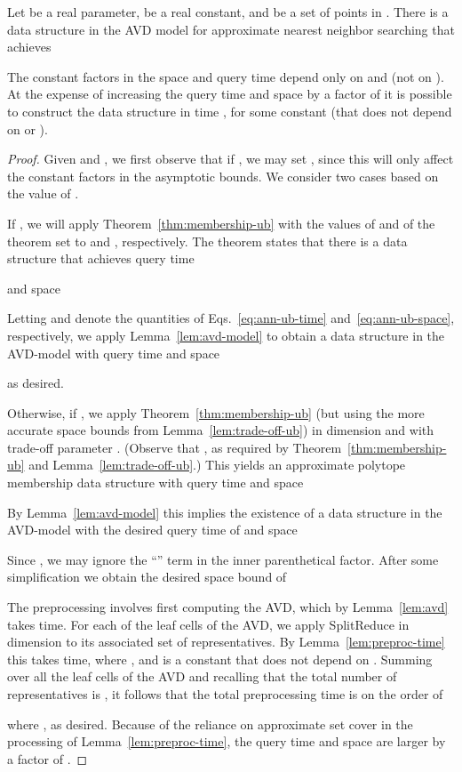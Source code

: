 \documentclass[11pt]{article}   \usepackage[letterpaper,hmargin=2.1cm,vmargin=3cm]{geometry}
\newcommand{\alg}{\textrm{SplitReduce}}
\begin{document}
\begin{lemma} \label{lem:ann-ub}
Let  be a real parameter,  be a real constant, and  be a set of  points in . There is a data structure in the AVD model for approximate nearest neighbor searching that achieves

The constant factors in the space and query time depend only on  and  (not on ). At the expense of increasing the query time and space by a factor of  it is possible to construct the data structure in time , for some constant  (that does not depend on  or ).
\end{lemma}


\begin{proof}
Given  and , we first observe that if , we may set , since this will only affect the constant factors in the asymptotic bounds. We consider two cases based on the value of . 

If , we will apply Theorem~\ref{thm:membership-ub} with the values of  and  of the theorem set to  and , respectively. The theorem states that there is a data structure that achieves query time 

and space

Letting  and  denote the quantities of Eqs.~\eqref{eq:ann-ub-time} and~\eqref{eq:ann-ub-space}, respectively, we apply Lemma~\ref{lem:avd-model} to obtain a data structure in the AVD-model with query time  and space

as desired.

Otherwise, if , we apply Theorem~\ref{thm:membership-ub} (but using the more accurate space bounds from Lemma~\ref{lem:trade-off-ub}) in dimension  and with trade-off parameter . (Observe that , as required by Theorem~\ref{thm:membership-ub} and Lemma~\ref{lem:trade-off-ub}.) This yields an approximate polytope membership data structure with query time  and space

By Lemma~\ref{lem:avd-model} this implies the existence of a data structure in the AVD-model with the desired query time of  and space

Since , we may ignore the ``'' term in the inner parenthetical factor. After some simplification we obtain the desired space bound of


The preprocessing involves first computing the AVD, which by Lemma~\ref{lem:avd} takes  time. For each of the  leaf cells  of the AVD, we apply {\alg} in dimension  to its associated set  of representatives. By Lemma~\ref{lem:preproc-time} this takes  time, where , and  is a constant that does not depend on . Summing over all the leaf cells of the AVD and recalling that the total number of representatives is , it follows that the total preprocessing time is on the order of

where , as desired. Because of the reliance on approximate set cover in the processing of Lemma~\ref{lem:preproc-time}, the query time and space are larger by a factor of .
\end{proof}
\end{document}
